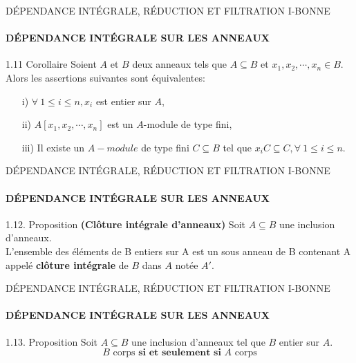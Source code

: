 \documentclass[11pt,a4paper]{beamer}
\begin{document}
\begin{frame}{DÉPENDANCE INTÉGRALE, RÉDUCTION ET FILTRATION I-BONNE}
	\framesubtitle{DÉPENDANCE INTÉGRALE SUR LES ANNEAUX}
	\begin{block}{1.11 Corollaire}
	Soient $A$ et $B$ deux anneaux tels que $A \subseteq  B$ et $x_1, x_2, \cdots, x_n \in B$.\\
	Alors les assertions suivantes sont équivalentes:
\begin{enumerate}
	\item[i)]$\forall \ 1 \leqslant i \leqslant n, x_i$ est entier sur $A$, \pause
	\item[ii)]$A[x_1, x_2, \cdots, x_n]$ est un $A$-module de type fini, \pause
	\item[iii)]Il existe un $A-module$ de type fini $C \subseteq  B$ tel que $x_i C \subseteq  C, \forall \ 1 \leqslant i \leqslant n$.
\end{enumerate}
	\end{block}
\end{frame}

\begin{frame}{DÉPENDANCE INTÉGRALE, RÉDUCTION ET FILTRATION I-BONNE}
	\framesubtitle{DÉPENDANCE INTÉGRALE SUR LES ANNEAUX}
	\begin{block}{1.12. Proposition \textbf{(Clôture intégrale d'anneaux)}}
	Soit $A \subseteq B$ une inclusion d'anneaux.\\
	L'ensemble des éléments de B entiers sur A est un sous anneau de B contenant A appelé \textbf{clôture intégrale} de $B$ dans $A$ notée $A'$.
	\end{block}
\end{frame}

\begin{frame}{DÉPENDANCE INTÉGRALE, RÉDUCTION ET FILTRATION I-BONNE}
	\framesubtitle{DÉPENDANCE INTÉGRALE SUR LES ANNEAUX}
	\begin{block}{1.13. Proposition}
	Soit $A \subseteq B$ une inclusion d'anneaux tel que $B$ entier sur $A$.
	\[ B \text{ corps} \textbf{ si et seulement si }  A \text{ corps} \]
	\end{block}
\end{frame}
\end{document}
